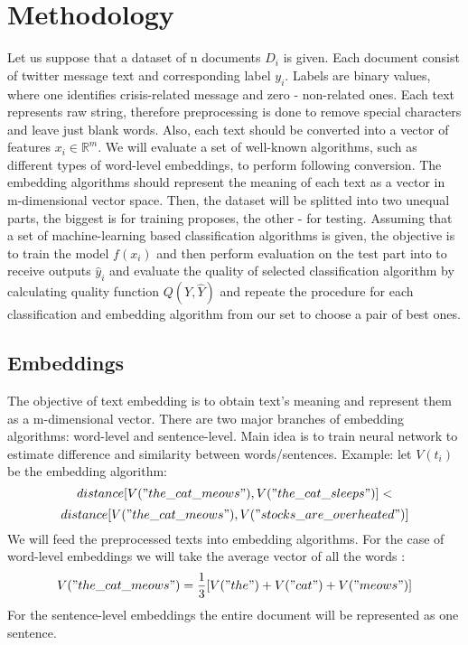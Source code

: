 \documentclass[unicode, 12pt, a4paper,oneside]{article}
\begin{document}
	\section{Methodology}

	Let us suppose that a dataset of n documents $D_i$ is given. Each document consist of twitter message text and corresponding label $y_i$. Labels are binary values, where one identifies crisis-related message and zero - non-related ones. Each text represents raw string, therefore preprocessing is done to remove special characters and leave just blank words. Also, each text should be converted into a vector of features $x_i \in \mathbb{R}^m$. We will evaluate a set of well-known algorithms, such as different types of word-level embeddings, to perform following conversion. The embedding algorithms should represent the meaning of each text as a vector in m-dimensional vector space. Then, the dataset will be splitted into two unequal parts, the biggest is for training proposes, the other - for testing. Assuming that a set of machine-learning based classification algorithms is given, the objective is to train the model $f(x_i)$ and then perform evaluation on the test part into to receive outputs $\hat{y}_i$ and evaluate the quality of selected classification algorithm by calculating quality function $Q(Y, \hat{Y})$ and repeate the procedure for each classification and embedding algorithm from our set to choose a pair of best ones.

	\subsection{Embeddings}
	The objective of text embedding is to obtain text's meaning and represent them as a m-dimensional vector. There are two major branches of embedding algorithms: word-level \cite{word2vec} and sentence-level\cite{infersent}. Main idea is to train neural network to estimate difference and similarity between words/sentences. Example: let $V(t_i)$ be the embedding algorithm: $$ distance[ V("the\_cat\_meows"), V("the\_cat\_sleeps")]<$$ $$distance[V("the\_cat\_meows"), V("stocks\_are\_overheated")]$$ We will feed the preprocessed texts into embedding algorithms. For the case of word-level embeddings we will take the average vector of all the words : $$V("the\_cat\_ meows") = \frac{1}{3}[V("the") + V("cat") + V("meows")]$$ For the sentence-level embeddings the entire document will be represented as one sentence.
\end{document}
